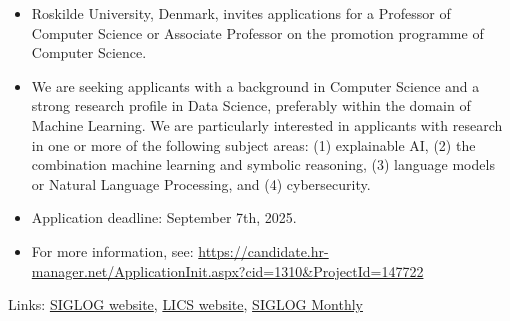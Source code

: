 \documentclass[prodmode,acmtecs]{acmsmall} %
\begin{document}
\begin{itemize}\item  Roskilde University, Denmark, invites applications for a Professor of Computer Science or Associate Professor on the promotion programme of Computer Science. 
 
\item  We are seeking applicants with a background in Computer Science and a strong research profile in Data Science, preferably within the domain of Machine Learning. We are particularly interested in applicants with research in one or more of the following subject areas: (1) explainable AI, (2) the combination machine learning and symbolic reasoning, (3) language models or Natural Language Processing, and (4) cybersecurity. 
 
\item  Application deadline: September 7th, 2025. 
 
\item  For more information, see: \href{https://candidate.hr-manager.net/ApplicationInit.aspx?cid=1310\&ProjectId=147722}{https://candidate.hr-manager.net/ApplicationInit.aspx?cid=1310\&ProjectId=147722} 
 
\end{itemize}


\bigskip Links: \href{http://siglog.org/}{SIGLOG website}, \href{https://lics.siglog.org}{LICS website}, \href{https://lics.siglog.org/newsletters/}{SIGLOG Monthly}
\end{document}
